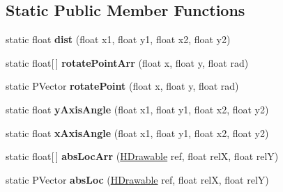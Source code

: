 \subsection*{Static Public Member Functions}
\begin{DoxyCompactItemize}
\item 
\hypertarget{classhype_1_1core_1_1util_1_1_h_math_a54ddb77d09819a97566169e528d368fa}{static float {\bfseries dist} (float x1, float y1, float x2, float y2)}\label{classhype_1_1core_1_1util_1_1_h_math_a54ddb77d09819a97566169e528d368fa}

\item 
\hypertarget{classhype_1_1core_1_1util_1_1_h_math_a49ad10c364949302030d0bf3b4d7b61a}{static float\mbox{[}$\,$\mbox{]} {\bfseries rotate\-Point\-Arr} (float x, float y, float rad)}\label{classhype_1_1core_1_1util_1_1_h_math_a49ad10c364949302030d0bf3b4d7b61a}

\item 
\hypertarget{classhype_1_1core_1_1util_1_1_h_math_af05dfc71b914823716240530923d3c6e}{static P\-Vector {\bfseries rotate\-Point} (float x, float y, float rad)}\label{classhype_1_1core_1_1util_1_1_h_math_af05dfc71b914823716240530923d3c6e}

\item 
\hypertarget{classhype_1_1core_1_1util_1_1_h_math_a3f7900f6ec7a6634c6466361f56518dd}{static float {\bfseries y\-Axis\-Angle} (float x1, float y1, float x2, float y2)}\label{classhype_1_1core_1_1util_1_1_h_math_a3f7900f6ec7a6634c6466361f56518dd}

\item 
\hypertarget{classhype_1_1core_1_1util_1_1_h_math_a89c9e83533424db313dc74705e150a26}{static float {\bfseries x\-Axis\-Angle} (float x1, float y1, float x2, float y2)}\label{classhype_1_1core_1_1util_1_1_h_math_a89c9e83533424db313dc74705e150a26}

\item 
\hypertarget{classhype_1_1core_1_1util_1_1_h_math_a9413e594cb033de1ee9c16fa9a08461a}{static float\mbox{[}$\,$\mbox{]} {\bfseries abs\-Loc\-Arr} (\hyperlink{classhype_1_1core_1_1drawable_1_1_h_drawable}{H\-Drawable} ref, float rel\-X, float rel\-Y)}\label{classhype_1_1core_1_1util_1_1_h_math_a9413e594cb033de1ee9c16fa9a08461a}

\item 
\hypertarget{classhype_1_1core_1_1util_1_1_h_math_a3802f83ae96f91470c6a5bb404207142}{static P\-Vector {\bfseries abs\-Loc} (\hyperlink{classhype_1_1core_1_1drawable_1_1_h_drawable}{H\-Drawable} ref, float rel\-X, float rel\-Y)}\label{classhype_1_1core_1_1util_1_1_h_math_a3802f83ae96f91470c6a5bb404207142}


\end{DoxyCompactItemize}
